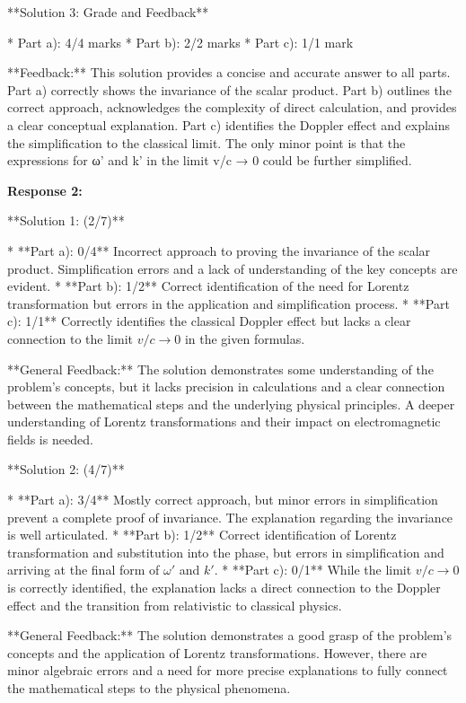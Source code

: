 \documentclass[a4paper,11pt]{article}
\begin{document}
**Solution 3: Grade and Feedback**

* Part a): 4/4 marks
* Part b): 2/2 marks
* Part c): 1/1 mark

**Feedback:** This solution provides a concise and accurate answer to all parts. Part a) correctly shows the invariance of the scalar product. Part b) outlines the correct approach, acknowledges the complexity of direct calculation, and provides a clear conceptual explanation. Part c) identifies the Doppler effect and explains the simplification to the classical limit. The only minor point is that the expressions for ω' and k' in the limit v/c → 0 could be further simplified.

\bigskip    
\textbf{Response 2:}

**Solution 1: (2/7)**

*   **Part a): 0/4** Incorrect approach to proving the invariance of the scalar product. Simplification errors and a lack of understanding of the key concepts are evident.
*   **Part b): 1/2** Correct identification of the need for Lorentz transformation but errors in the application and simplification process.
*   **Part c): 1/1** Correctly identifies the classical Doppler effect but lacks a clear connection to the limit \( v/c \rightarrow 0 \) in the given formulas.

**General Feedback:** The solution demonstrates some understanding of the problem's concepts, but it lacks precision in calculations and a clear connection between the mathematical steps and the underlying physical principles. A deeper understanding of Lorentz transformations and their impact on electromagnetic fields is needed.

**Solution 2: (4/7)**

*   **Part a): 3/4** Mostly correct approach, but minor errors in simplification prevent a complete proof of invariance. The explanation regarding the invariance is well articulated.
*   **Part b): 1/2** Correct identification of Lorentz transformation and substitution into the phase, but errors in simplification and arriving at the final form of \(\omega'\) and \(k'\).
*   **Part c): 0/1** While the limit \( v/c \rightarrow 0 \) is correctly identified, the explanation lacks a direct connection to the Doppler effect and the transition from relativistic to classical physics.

**General Feedback:** The solution demonstrates a good grasp of the problem's concepts and the application of Lorentz transformations. However, there are minor algebraic errors and a need for more precise explanations to fully connect the mathematical steps to the physical phenomena.
\end{document}
